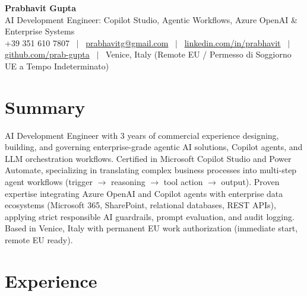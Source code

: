 \documentclass[a4paper,10pt]{article}
\begin{document}
\begin{minipage}[c]{0.80\textwidth}
  {\Huge\bfseries Prabhavit Gupta}\\[3pt]
  {\color{accent}\large AI Development Engineer: Copilot Studio, Agentic Workflows, Azure OpenAI \& Enterprise Systems}\\[6pt]
  {\footnotesize +39 351 610 7807 ~$\vert$~
  \href{mailto:prabhavitg@gmail.com}{prabhavitg@gmail.com} ~$\vert$~
  \href{https://www.linkedin.com/in/prabhavit/}{linkedin.com/in/prabhavit} ~$\vert$~
  \href{https://github.com/prab-gupta}{github.com/prab-gupta} ~$\vert$~
  Venice, Italy (Remote EU / Permesso di Soggiorno UE a Tempo Indeterminato)}
\end{minipage}\hfill

\section{Summary}
AI Development Engineer with 3 years of commercial experience designing, building, and governing enterprise-grade agentic AI solutions, Copilot agents, and LLM orchestration workflows. Certified in Microsoft Copilot Studio and Power Automate, specializing in translating complex business processes into multi-step agent workflows (trigger $\rightarrow$ reasoning $\rightarrow$ tool action $\rightarrow$ output). Proven expertise integrating Azure OpenAI and Copilot agents with enterprise data ecosystems (Microsoft 365, SharePoint, relational databases, REST APIs), applying strict responsible AI guardrails, prompt evaluation, and audit logging. Based in Venice, Italy with permanent EU work authorization (immediate start, remote EU ready).

\section{Experience}
\end{document}
